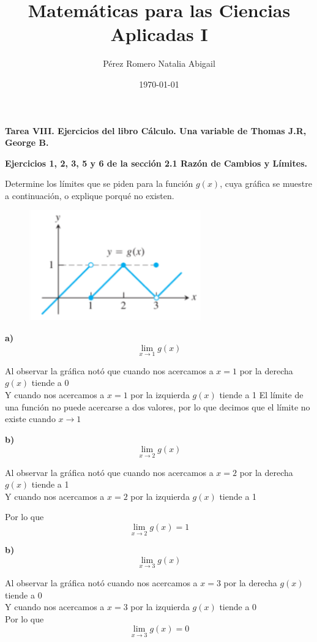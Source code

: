 \documentclass[12pt, letterpaper]{article}
\title{Matemáticas para las Ciencias Aplicadas I}
\author{Pérez Romero Natalia Abigail}
\date{\today}
\begin{document}
\maketitle
\textbf{Tarea VIII. Ejercicios del libro Cálculo. Una variable de Thomas J.R, George B.}

\textbf{Ejercicios 1, 2, 3, 5 y 6 de la sección 2.1 Razón de Cambios y Límites.}

Determine los límites que se piden para la función $g(x)$, cuya gráfica se muestre a continuación, o explique porqué no existen.
\begin{figure}[ht]
\centering
\includegraphics[width=20em]{t8uno}
\end{figure}

\textbf{a)} \[ \lim_{x \to 1} g(x)\]

Al observar la gráfica notó que cuando nos acercamos a $x = 1$  por la derecha $g(x)$ tiende a 0\\
Y cuando nos acercamos a $x = 1$ por la izquierda $g(x)$ tiende a 1
El límite de una función no puede acercarse a dos valores, por lo que decimos que el límite no existe cuando $x \to 1$

\textbf{b)} \[ \lim_{x \to 2} g(x)\]

Al observar la gráfica notó que cuando nos acercamos a $x = 2$  por la derecha $g(x)$ tiende a 1\\
Y cuando nos acercamos a $x = 2$ por la izquierda $g(x)$ tiende a 1

Por lo que \[ \lim_{x \to 2} g(x) = 1\]

\textbf{b)} \[ \lim_{x \to 3} g(x)\]

Al observar la gráfica notó cuando nos acercamos a $x = 3$  por la derecha $g(x)$ tiende a 0\\
Y cuando nos acercamos a $x = 3$ por la izquierda $g(x)$ tiende a 0\\

Por lo que \[ \lim_{x \to 3} g(x) = 0\]
\end{document}
